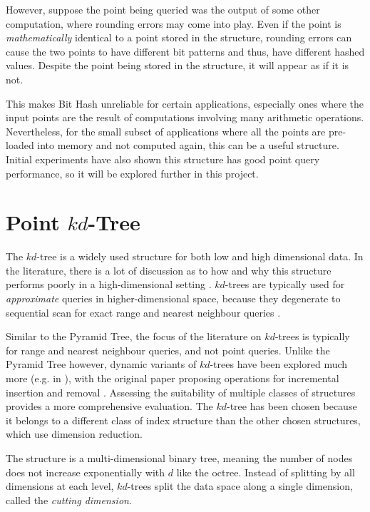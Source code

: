 However, suppose the point being queried was the output of some other computation, where rounding errors may come into play. Even if the point is \textit{mathematically} identical to a point stored in the structure, rounding errors can cause the two points to have different bit patterns and thus, have different hashed values.  Despite the point being stored in the structure, it will appear as if it is not. 

This makes Bit Hash unreliable for certain applications, especially ones where the input points are the result of computations involving many arithmetic operations. Nevertheless, for the small subset of applications where all the points are pre-loaded into memory and not computed again, this can be a useful structure. Initial experiments have also shown this structure has good point query performance, so it will be explored further in this project.

\section{Point $kd$-Tree}
\label{sec:kd-tree-detail}

The $kd$-tree is a widely used structure for both low and high dimensional data. In the literature, there is a lot of discussion as to how and why this structure performs poorly in a high-dimensional setting \cite{highd-nn, search-highd-analysis}. $kd$-trees are typically used for \textit{approximate} queries in higher-dimensional space, because they degenerate to sequential scan for exact range and nearest neighbour queries \cite{similarity-searching}. 

Similar to the Pyramid Tree, the focus of the literature on $kd$-trees is typically for range and nearest neighbour queries, and not point queries. Unlike the Pyramid Tree however, dynamic variants of $kd$-trees have been explored much more (e.g. in \cite{bkd-tree, kdb-tree}), with the original paper proposing operations for incremental insertion and removal \cite{kd-tree}. Assessing the suitability of multiple classes of structures provides a more comprehensive evaluation. The $kd$-tree has been chosen because it belongs to a different class of index structure than the other chosen structures, which use dimension reduction.

The structure is a multi-dimensional binary tree, meaning the number of nodes does not increase exponentially with $d$ like the octree. Instead of splitting by all dimensions at each level, $kd$-trees split the data space along a single dimension, called the \textit{cutting dimension}.

